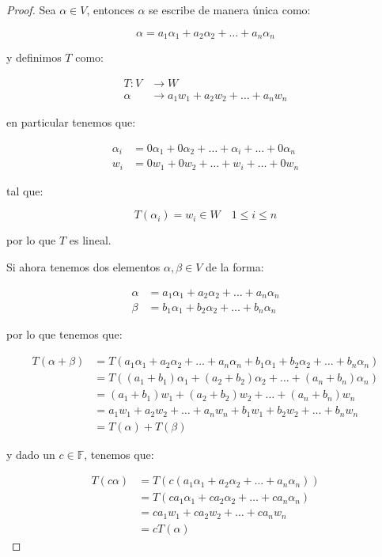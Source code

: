 		\begin{proof}
			Sea $\alpha \in V$, entonces $\alpha$ se escribe de manera única como:

			\begin{equation*}
				\alpha = a_1 \alpha_1 + a_2 \alpha_2 + \dots + a_n \alpha_n
			\end{equation*}

			y definimos $T$ como:

			\begin{align*}
				T \colon V &\to W \\
				\alpha &\to a_1 w_1 + a_2 w_2 + \dots + a_n w_n
			\end{align*}

			en particular tenemos que:

			\begin{align*}
				\alpha_i &= 0 \alpha_1 + 0 \alpha_2 + \dots  + \alpha_i + \dots + 0 \alpha_n \\
				w_i &= 0 w_1 + 0 w_2 + \dots  + w_i + \dots + 0 w_n
			\end{align*}

			tal que:

			\begin{equation*}
				T(\alpha_i) = w_i \in W \quad 1 \leq i \leq n
			\end{equation*}

			por lo que $T$ es lineal.

			Si ahora tenemos dos elementos $\alpha, \beta \in V$ de la forma:

			\begin{align*}
				\alpha &= a_1 \alpha_1 + a_2 \alpha_2 + \dots + a_n \alpha_n \\
				\beta &= b_1 \alpha_1 + b_2 \alpha_2 + \dots + b_n \alpha_n
			\end{align*}

			por lo que tenemos que:

			\begin{align*}
				T(\alpha + \beta) &= T(a_1 \alpha_1 + a_2 \alpha_2 + \dots + a_n \alpha_n + b_1 \alpha_1 + b_2 \alpha_2 + \dots + b_n \alpha_n) \\
				&= T((a_1 + b_1) \alpha_1 + (a_2 + b_2) \alpha_2 + \dots + (a_n + b_n) \alpha_n) \\
				&= (a_1 + b_1) w_1 + (a_2 + b_2) w_2 + \dots + (a_n + b_n) w_n \\
				&= a_1 w_1 + a_2 w_2 + \dots + a_n w_n + b_1 w_1 + b_2 w_2 + \dots + b_n w_n \\
				&= T(\alpha) + T(\beta)
			\end{align*}

			y dado un $c \in \mathbb{F}$, tenemos que:

			\begin{align*}
				T(c \alpha) &= T(c (a_1 \alpha_1 + a_2 \alpha_2 + \dots + a_n \alpha_n)) \\
				&= T(c a_1 \alpha_1 + c a_2 \alpha_2 + \dots + c a_n \alpha_n) \\
				&= c a_1 w_1 + c a_2 w_2 + \dots + c a_n w_n \\
				&= c T(\alpha)
			\end{align*}
		\end{proof}

